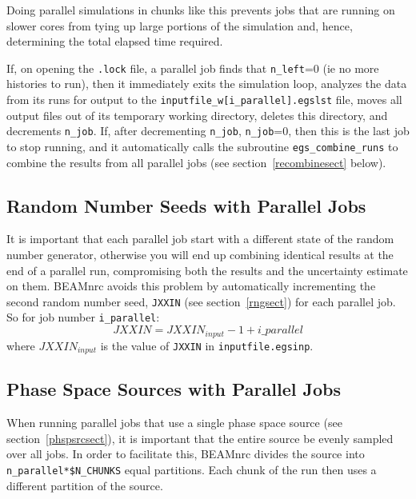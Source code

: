 \documentclass[12pt,twoside]{article}
\begin{document}
Doing parallel simulations in chunks like this prevents jobs that are
running on slower cores from tying up large portions of the simulation
and, hence, determining the total elapsed time required.

 
If, on opening the {\tt .lock} file, a parallel job finds that
{\tt n\_left}=0 (ie no more histories to run), then it immediately
exits the simulation loop, analyzes the data from its runs for output
to the {\tt inputfile\_w[i\_parallel].egslst} file, moves all output
files out of its temporary working directory, deletes this directory,
and decrements {\tt n\_job}.  If, after decrementing {\tt n\_job},
{\tt n\_job}=0, then this is the last job to stop running, and it
automatically calls the subroutine {\tt egs\_combine\_runs}
to combine the results from all parallel jobs
(see section~\ref{recombinesect} below).

\subsection{Random Number Seeds with Parallel Jobs}
It is important that each parallel job start with a different
state of the random number generator,
otherwise you will end up combining identical
results at the end of a parallel run, compromising both the results
and the uncertainty estimate on them.
BEAMnrc avoids this problem by automatically incrementing the
second random number seed, {\tt JXXIN} (see section~\ref{rngsect}) for
each parallel job.  So for job number {\tt i\_parallel}:
\begin{equation}
JXXIN=JXXIN_{input} -1 + i\_parallel
\end{equation}
where $JXXIN_{input}$ is the value of {\tt JXXIN} in
{\tt inputfile.egsinp}.

\subsection{Phase Space Sources with Parallel Jobs}
\label{phspparsect}

When running parallel jobs that use a single phase space source
(see section~\ref{phspsrcsect}), it is important that the entire
source be evenly sampled over all jobs.  In order to
facilitate this, BEAMnrc divides the source into
{\tt n\_parallel*\$N\_CHUNKS} equal partitions.  Each chunk of
the run then uses a different partition of the source.
\end{document}
